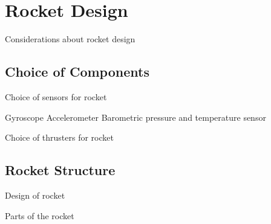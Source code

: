 \chapter{Rocket Design}

Considerations about rocket design

\section{Choice of Components}
Choice of sensors for rocket

Gyroscope
Accelerometer
Barometric pressure and temperature sensor


Choice of thrusters for rocket

\section{Rocket Structure}
Design of rocket

Parts of the rocket 


